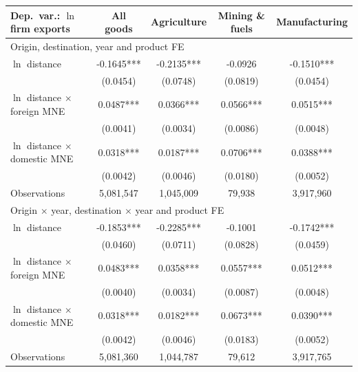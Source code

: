 \begin{tabular}{lcccc} \hline
Dep.\ var.: $\ln$ firm exports & All goods & Agriculture & Mining \& fuels & Manufacturing \\ \hline
\multicolumn{5}{l}{\footnotesize Origin, destination, year and product FE} \\
\quad $\ln$ distance & -0.1645*** & -0.2135*** & -0.0926 & -0.1510*** \\
 & (0.0454) & (0.0748) & (0.0819) & (0.0454) \\
\quad $\ln$ distance $\times$ foreign MNE & 0.0487*** & 0.0366*** & 0.0566*** & 0.0515*** \\
 & (0.0041) & (0.0034) & (0.0086) & (0.0048) \\
\quad $\ln$ distance $\times$ domestic MNE & 0.0318*** & 0.0187*** & 0.0706*** & 0.0388*** \\
 & (0.0042) & (0.0046) & (0.0180) & (0.0052) \\
\quad Observations & 5,081,547 & 1,045,009 & 79,938 & 3,917,960 \\
\midrule
\multicolumn{5}{l}{\footnotesize Origin $\times$ year, destination $\times$ year and product FE} \\
\quad $\ln$ distance & -0.1853*** & -0.2285*** & -0.1001 & -0.1742*** \\
 & (0.0460) & (0.0711) & (0.0828) & (0.0459) \\
\quad $\ln$ distance $\times$ foreign MNE & 0.0483*** & 0.0358*** & 0.0557*** & 0.0512*** \\
 & (0.0040) & (0.0034) & (0.0087) & (0.0048) \\
\quad $\ln$ distance $\times$ domestic MNE & 0.0318*** & 0.0182*** & 0.0673*** & 0.0390*** \\
 & (0.0042) & (0.0046) & (0.0183) & (0.0052) \\
\quad Observations & 5,081,360 & 1,044,787 & 79,612 & 3,917,765 \\
\hline
\end{tabular}
